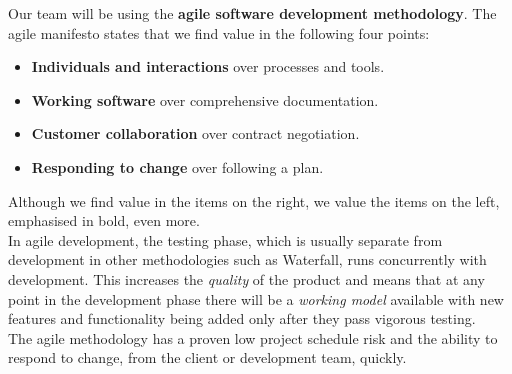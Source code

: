 
Our team will be using the \textbf{agile software development methodology}. The agile manifesto states that we find value in the following four points:\\
\begin{itemize}
	\item \textbf{Individuals and interactions} over processes and tools.
	\item \textbf{Working software} over comprehensive documentation.
	\item \textbf{Customer collaboration} over contract negotiation.
	\item \textbf{Responding to change} over following a plan.
\end{itemize}
Although we find value in the items on the right, we value the items on the left, emphasised in bold, even more.\\
In agile development, the testing phase, which is usually separate from development in other methodologies such as Waterfall, runs concurrently with development. This increases the \emph{quality} of the product and means that at any point in the development phase there will be a \emph{working model} available with new features and functionality being added only after they pass vigorous testing.\\
The agile methodology has a proven low project schedule risk and the ability to respond to change, from the client or development team, quickly.
